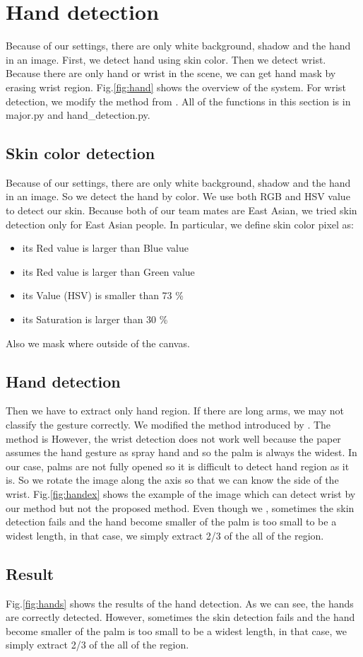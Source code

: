 \section{Hand detection}
Because of our settings, there are only white background, shadow and the hand in an image.
First, we detect hand using skin color. Then we detect wrist. Because there are only hand or wrist in the scene, we can get hand mask by erasing wrist region. Fig.\ref{fig:hand} shows the overview of the system. For wrist detection, we modify the method from \cite{ra11}.
All of the functions in this section is in major.py and hand\_detection.py.
\subsection{Skin color detection}
Because of our settings, there are only white background, shadow and the hand in an image.
So we detect the hand by color. We use both RGB and HSV value to detect our skin.
Because both of our team mates are East Asian, we tried skin detection only for East Asian people.
In particular, we define skin color pixel as:
\begin{itemize}
  \item its Red value is larger than Blue value
  \item its Red value is larger than Green value
  \item its Value (HSV) is smaller than 73 \%
  \item its Saturation is larger than 30 \%
 \end{itemize}
Also we mask where outside of the canvas.
\subsection{Hand detection}
Then we have to extract only hand region. If there are long arms, we may not classify the gesture correctly. We modified the method introduced by \cite{ra11}. The method is 
However, the wrist detection does not work well because the paper assumes the hand gesture as spray hand and so the palm is always the widest. 
In our case, palms are not fully opened so it is difficult to detect hand region as it is. 
So we rotate the image along the axis so that we can know the side of the wrist. 
Fig.\ref{fig:handex} shows the example of the image which can detect wrist by our method but not the proposed method.
Even though we , sometimes the skin detection fails and the hand become smaller of the palm is too small to be a widest length, in that case, we simply extract 2/3 of the all of the region.

\subsection{Result}
Fig.\ref{fig:hands} shows the results of the hand detection.
As we can see, the hands are correctly detected.
However, sometimes the skin detection fails and the hand become smaller of the palm is too small to be a widest length, in that case, we simply extract 2/3 of the all of the region.
